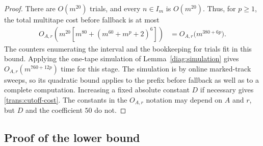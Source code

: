\begin{proof}
There are $O(m^{20})$ trials, and every $n\in I_m$ is $O(m^{20})$.
Thus, for $p\ge1$, the total multitape cost before fallback is at most
\begin{align*}
  O_{A,r}\left(
    m^{20}\left[m^{80}+(m^{60}+m^p+2)^6\right]
  \right)
  &=O_{A,r}\bigl(m^{380+6p}\bigr).
\end{align*}
The counters enumerating the interval and the bookkeeping for trials fit
in this bound. Applying the one-tape simulation of
Lemma~\ref{diag:simulation} gives
$O_{A,r}(m^{760+12p})$ time for this stage. The simulation is by online
marked-track sweeps, so its quadratic bound applies to the prefix before
fallback as well as to a complete computation. Increasing a fixed absolute
constant $D$ if necessary gives \eqref{trans:cutoff-cost}. The constants
in the $O_{A,r}$ notation may depend on $A$ and $r$, but $D$ and the
coefficient $50$ do not.
\end{proof}

\subsection{Proof of the lower bound}

